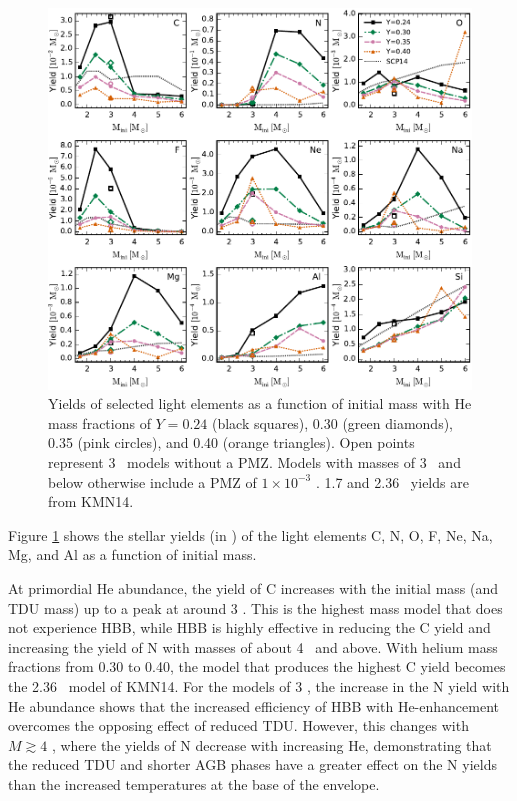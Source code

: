 \begin{figure}
 \begin{center}\includegraphics[width=\textwidth]{fig-yieldslightelvsmass.pdf}\end{center}
 \caption{Yields of selected light elements as a function of initial mass with He mass fractions of $Y= 0.24$ (black squares), 0.30 (green diamonds), 0.35 (pink circles), and 0.40 (orange triangles). Open points represent 3 \Msun\ models without a PMZ. Models with masses of 3 \Msun\ and below otherwise include a PMZ of $1\times10^{-3}$ \Msun. 1.7 and 2.36 \Msun\ yields are from KMN14.}\label{fig:yieldslightelvsmass}
\end{figure}

Figure \ref{fig:yieldslightelvsmass} shows the stellar yields (in \Msun) of the light elements C, N, O, F, Ne, Na, Mg, and Al as a function of initial mass.

At primordial He abundance, the yield of C increases with the initial mass (and TDU mass) up to a peak at around 3 \Msun. This is the highest mass model that does not experience HBB, while HBB is highly effective in reducing the C yield and increasing the yield of N with masses of about 4 \Msun\ and above. With helium mass fractions from 0.30 to 0.40, the model that produces the highest C yield becomes the 2.36 \Msun\ model of KMN14. For the models of 3 \Msun, the increase in the N yield with He abundance shows that the increased efficiency of HBB with He-enhancement overcomes the opposing effect of reduced TDU. However, this changes with $M \gtrsim 4$ \Msun, where the yields of N decrease with increasing He, demonstrating that the reduced TDU and shorter AGB phases have a greater effect on the N yields than the increased temperatures at the base of the envelope.

